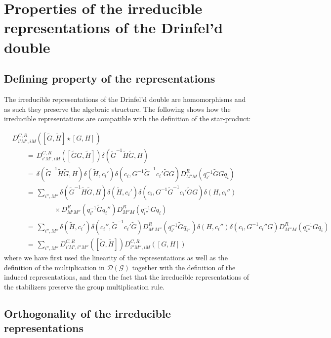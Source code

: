 \documentclass[nofootinbib,superscriptaddress,eqsecnum,tightenlines,11pt]{revtex4-1}
\def\nn{\nonumber}
\def\q{\qquad}
\def\wG{\widetilde{G}}
\def\wH{\widetilde{H}}
\begin{document}
\section{Properties of the irreducible representations of the Drinfel'd double \label{app_irrepsandsoon}}

\subsection{Defining property of the representations}
The irreducible representations of the Drinfel'd double are homomorphisms and as such they preserve the algebraic structure. The following shows how the irreducible representations are compatible with the definition of the star-product:

\begin{align} \nn
	&D^{C,R}_{i'M',iM}([\widetilde{G},\widetilde{H}]\star [G,H]) \\[0.5em] \nn &\q = \, D^{C,R}_{i'M',iM}([\widetilde{G}G,\widetilde{H}])\delta(\wG^{-1}\wH\wG,H) \\[0.5em] \nn
	&\q = \, \delta(\wG^{-1}\wH\wG,H)\delta(\wH,c_i')\delta(c_i,G^{-1}\wG^{-1}c_i'\wG G)D^R_{M'M}(q_{i'}^{-1}\wG G q_i) \\[0.5em] \nn
	&\q = \, \sum_{i'',M''}\delta(\wG^{-1}{\wH\wG,H})\delta(\wH,c_i')\delta(c_i,G^{-1}\wG^{-1}c_i'\wG G)\delta(H,c_i'') \\[-1em] \nn
			& \q \q \q \times D^R_{M'M''}(q_{i'}^{-1}\wG  q_i'')D^R_{M''M}(q_{i''}^{-1}Gq_i)  \\[0.5em] \nn
	&\q = \, \sum_{i'',M''}\delta(\wH,c_i')\delta(c_i'',\wG^{-1}c_i'\wG)D^R_{M'M''}(q_{i'}^{-1}\wG q_{i''})\delta(H,c_i'')\delta(c_i,G^{-1}c_i''G)D^R_{M''M}(q_{i''}^{-1}Gq_i) \\
&\q = \,  \sum_{i'',M''}D^{C,R}_{i'M',i''M''}([\wG,\wH])D^{C,R}_{i''M'',iM}([G,H])%
\end{align}
where we have first used the linearity of the representations as well as the definition of the multiplication in $\mathcal{D}(\mathcal{G})$ together with the definition of the induced representations, and then the fact that the irreducible representations of the stabilizers preserve the group multiplication rule. 

\subsection{Orthogonality of the irreducible representations}
\end{document}
